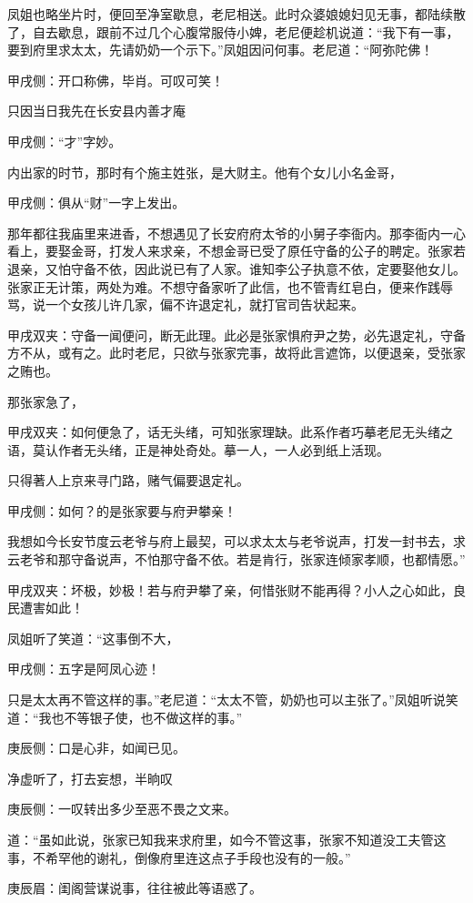 \begin{parag}
    凤姐也略坐片时，便回至净室歇息，老尼相送。此时众婆娘媳妇见无事，都陆续散了，自去歇息，跟前不过几个心腹常服侍小婢，老尼便趁机说道：“我下有一事，要到府里求太太，先请奶奶一个示下。”凤姐因问何事。老尼道：“阿弥陀佛！\begin{note}甲戌侧：开口称佛，毕肖。可叹可笑！\end{note}只因当日我先在长安县内善才庵\begin{note}甲戌侧：“才”字妙。\end{note}内出家的时节，那时有个施主姓张，是大财主。他有个女儿小名金哥，\begin{note}甲戌侧：俱从“财”一字上发出。\end{note}那年都往我庙里来进香，不想遇见了长安府府太爷的小舅子李衙内。那李衙内一心看上，要娶金哥，打发人来求亲，不想金哥已受了原任守备的公子的聘定。张家若退亲，又怕守备不依，因此说已有了人家。谁知李公子执意不依，定要娶他女儿。张家正无计策，两处为难。不想守备家听了此信，也不管青红皂白，便来作践辱骂，说一个女孩儿许几家，偏不许退定礼，就打官司告状起来。\begin{note}甲戌双夹：守备一闻便问，断无此理。此必是张家惧府尹之势，必先退定礼，守备方不从，或有之。此时老尼，只欲与张家完事，故将此言遮饰，以便退亲，受张家之贿也。\end{note}那张家急了，\begin{note}甲戌双夹：如何便急了，话无头绪，可知张家理缺。此系作者巧摹老尼无头绪之语，莫认作者无头绪，正是神处奇处。摹一人，一人必到纸上活现。\end{note}只得著人上京来寻门路，赌气偏要退定礼。\begin{note}甲戌侧：如何？的是张家要与府尹攀亲！\end{note}我想如今长安节度云老爷与府上最契，可以求太太与老爷说声，打发一封书去，求云老爷和那守备说声，不怕那守备不依。若是肯行，张家连倾家孝顺，也都情愿。”\begin{note}甲戌双夹：坏极，妙极！若与府尹攀了亲，何惜张财不能再得？小人之心如此，良民遭害如此！\end{note}
\end{parag}


\begin{parag}
    凤姐听了笑道：“这事倒不大，\begin{note}甲戌侧：五字是阿凤心迹！\end{note}只是太太再不管这样的事。”老尼道：“太太不管，奶奶也可以主张了。”凤姐听说笑道：“我也不等银子使，也不做这样的事。”\begin{note}庚辰侧：口是心非，如闻已见。\end{note}净虚听了，打去妄想，半晌叹\begin{note}庚辰侧：一叹转出多少至恶不畏之文来。\end{note}道：“虽如此说，张家已知我来求府里，如今不管这事，张家不知道没工夫管这事，不希罕他的谢礼，倒像府里连这点子手段也没有的一般。”\begin{note}庚辰眉：闺阁营谋说事，往往被此等语惑了。\end{note}
\end{parag}


